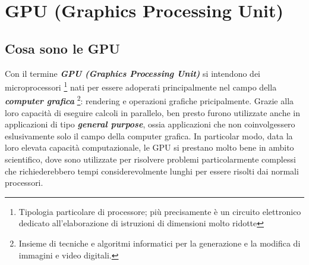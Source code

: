 \def\baselinestretch{1}
\chapter{GPU (Graphics Processing Unit)} \label{cap:GPU}
\def\baselinestretch{1.66}

\section{Cosa sono le GPU}
\noindent Con il termine \textit{\textbf{GPU (Graphics Processing Unit)}} si intendono dei microprocessori \footnote{Tipologia particolare di processore; più precisamente è un circuito elettronico dedicato all'elaborazione di istruzioni di dimensioni molto ridotte} nati per essere adoperati principalmente nel campo della \textit{\textbf{computer grafica}} \footnote{Insieme di tecniche e algoritmi informatici per la generazione e la modifica di immagini e video digitali.}: rendering e operazioni grafiche pricipalmente. Grazie alla loro capacità di eseguire calcoli in parallelo, ben presto furono utilizzate anche in applicazioni di tipo \textit{\textbf{general purpose}}, ossia applicazioni che non coinvolgessero eslusivamente solo il campo della computer grafica. In particolar modo, data la loro elevata capacità computazionale, le GPU si prestano molto bene in ambito scientifico, dove sono utilizzate per risolvere problemi particolarmente complessi che richiederebbero tempi considerevolmente lunghi per essere risolti dai normali processori.

